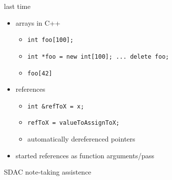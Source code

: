\begin{comment}
\begin{frame}{last time}
    \begin{itemize}
    \item pointers
        \begin{itemize}
        \item memory --- array of bytes
        \item pointers --- indices into array --- addresses
        \item {\tt T *} --- pointer to T type
        \item {\tt *somePointer} --- use thing at address `pointed to'
        \item {\tt \&someVariable} --- address of someVariable
            \begin{itemize}
            \item AKA ``pointer to'' someVariable
            \end{itemize}
        \end{itemize}
    \item started {\tt new}/{\tt delete}
    \end{itemize}
\end{frame}
\end{comment}
\begin{frame}[fragile,label=lastTime]{last time}
\lstset{language=C++,style=small}
    \begin{itemize}
    \item arrays in C++
        \begin{itemize}
        \item \lstinline|int foo[100];|
        \item \lstinline|int *foo = new int[100]; ... delete foo;|
        \item \lstinline|foo[42]|
        \end{itemize}
    \item references
        \begin{itemize}
        \item \lstinline|int &refToX = x;|
        \item \lstinline|refToX = valueToAssignToX;|
        \item automatically dereferenced pointers
        \end{itemize}
    \item started references as function arguments/pass
    \end{itemize}
\end{frame}

\begin{frame}{SDAC note-taking assistence}
\end{frame}
